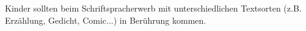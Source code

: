 Kinder sollten beim Schriftspracherwerb mit unterschiedlichen Textsorten (z.B. Erzählung, Gedicht, Comic...) in Berührung kommen.